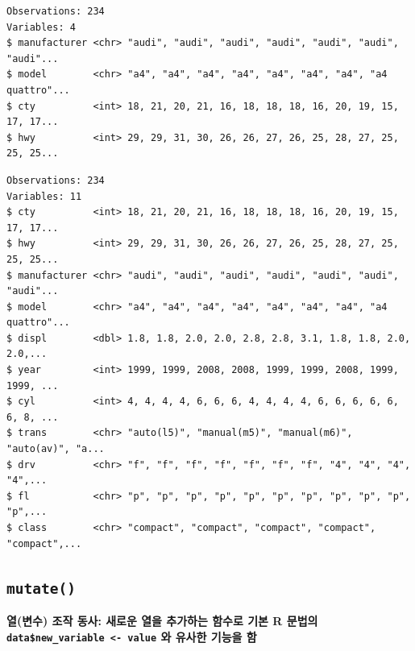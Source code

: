 \documentclass[
  11pt,
]{krantz}
\makeatletter
\newenvironment{Shaded}{\begin{snugshade}}{\end{snugshade}}
\newcommand{\CommentTok}[1]{\textcolor[rgb]{0.37,0.37,0.37}{\textit{#1}}}
\newcommand{\KeywordTok}[1]{\textcolor[rgb]{0.27,0.27,0.27}{\textbf{#1}}}
\newcommand{\NormalTok}[1]{#1}
\newcommand{\OperatorTok}[1]{\textcolor[rgb]{0.43,0.43,0.43}{\textbf{#1}}}
\newcommand{\StringTok}[1]{\textcolor[rgb]{0.5,0.5,0.5}{#1}}
\newenvironment{kframe}{%
\medskip{}
\setlength{\fboxsep}{.8em}
 \def\at@end@of@kframe{}%
 \ifinner\ifhmode%
  \def\at@end@of@kframe{\end{minipage}}%
  \begin{minipage}{\columnwidth}%
 \fi\fi%
 \def\FrameCommand##1{\hskip\@totalleftmargin \hskip-\fboxsep
 \colorbox{shadecolor}{##1}\hskip-\fboxsep
     \hskip-\linewidth \hskip-\@totalleftmargin \hskip\columnwidth}%
 \MakeFramed {\advance\hsize-\width
   \@totalleftmargin\z@ \linewidth\hsize
   \@setminipage}}%
 {\par\unskip\endMakeFramed%
 \at@end@of@kframe}
\renewenvironment{quote}{\begin{kframe}}{\end{kframe}}
\makeatother
\begin{document}
\begin{verbatim}
Observations: 234
Variables: 4
$ manufacturer <chr> "audi", "audi", "audi", "audi", "audi", "audi", "audi"...
$ model        <chr> "a4", "a4", "a4", "a4", "a4", "a4", "a4", "a4 quattro"...
$ cty          <int> 18, 21, 20, 21, 16, 18, 18, 18, 16, 20, 19, 15, 17, 17...
$ hwy          <int> 29, 29, 31, 30, 26, 26, 27, 26, 25, 28, 27, 25, 25, 25...
\end{verbatim}

\begin{Shaded}
\end{Shaded}

\begin{verbatim}
Observations: 234
Variables: 11
$ cty          <int> 18, 21, 20, 21, 16, 18, 18, 18, 16, 20, 19, 15, 17, 17...
$ hwy          <int> 29, 29, 31, 30, 26, 26, 27, 26, 25, 28, 27, 25, 25, 25...
$ manufacturer <chr> "audi", "audi", "audi", "audi", "audi", "audi", "audi"...
$ model        <chr> "a4", "a4", "a4", "a4", "a4", "a4", "a4", "a4 quattro"...
$ displ        <dbl> 1.8, 1.8, 2.0, 2.0, 2.8, 2.8, 3.1, 1.8, 1.8, 2.0, 2.0,...
$ year         <int> 1999, 1999, 2008, 2008, 1999, 1999, 2008, 1999, 1999, ...
$ cyl          <int> 4, 4, 4, 4, 6, 6, 6, 4, 4, 4, 4, 6, 6, 6, 6, 6, 6, 8, ...
$ trans        <chr> "auto(l5)", "manual(m5)", "manual(m6)", "auto(av)", "a...
$ drv          <chr> "f", "f", "f", "f", "f", "f", "f", "4", "4", "4", "4",...
$ fl           <chr> "p", "p", "p", "p", "p", "p", "p", "p", "p", "p", "p",...
$ class        <chr> "compact", "compact", "compact", "compact", "compact",...
\end{verbatim}

\normalsize

\hypertarget{dplyr-mutate}{%
\subsection{\texorpdfstring{\texttt{mutate()}}{mutate()}}\label{dplyr-mutate}}

\begin{quote}
\textbf{열(변수) 조작 동사: 새로운 열을 추가하는 함수로 기본 R 문법의 \texttt{data\$new\_variable\ \textless{}-\ value} 와 유사한 기능을 함}
\end{quote}
\end{document}
